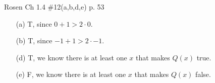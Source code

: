 \documentclass[12pt,addpoints]{exam}
\begin{document}
\begin{questions}
\question[4] Rosen Ch 1.4 \#12(a,b,d,e) p. 53
%
    \begin{solution}
    \begin{itemize}
        \item[(a)] T, since $0 + 1 > 2\cdot 0$.
        \item[(b)] T, since $-1 + 1 > 2\cdot -1$.
        \item[(d)] T, we know there is at least one $x$ that makes $Q(x)$ true.
        \item[(e)] F, we know there is at least one $x$ that makes $Q(x)$ false.
    \end{itemize}
    \end{solution}


\end{questions}
\end{document}
